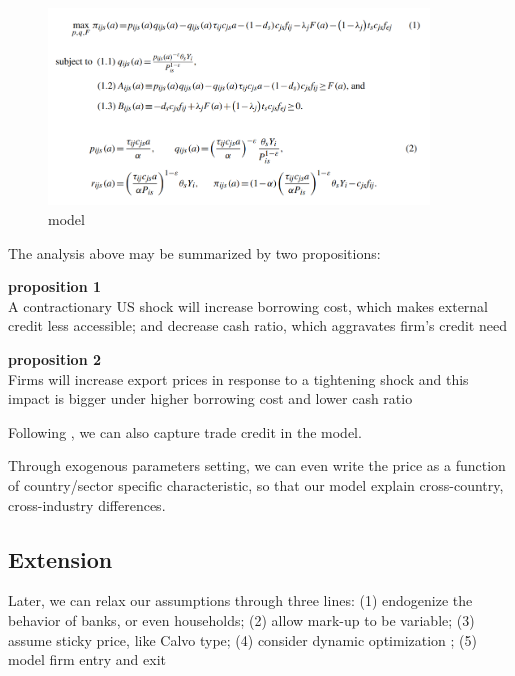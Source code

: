 \documentclass[12pt]{article}
\begin{document}
\begin{figure}
     \centering
         \includegraphics[width=0.9\textwidth]{latex/2023.10/Picture/Manova_model.png}
         \caption{\cite{manova2013credit} model}
         \label{fig: Manova_model}
\end{figure}

The analysis above may be summarized by two propositions:

\textbf{proposition 1} \\
A contractionary US shock will increase borrowing cost, which makes external credit less accessible; and decrease cash ratio, which aggravates firm's credit need

\textbf{proposition 2} \\
Firms will increase export prices in response to a tightening shock and this impact is bigger under higher borrowing cost and lower cash ratio


Following \cite{corugedo2011understanding}, we can also capture trade credit in the model.

Through exogenous parameters setting, we can even write the price as a function of country/sector specific characteristic, so that our model explain cross-country, cross-industry differences.


\subsection{Extension} 

Later, we can relax our assumptions through three lines: (1) endogenize the behavior of banks, or even households; (2) allow mark-up to be variable; (3) assume sticky price, like Calvo type; (4) consider dynamic optimization
; (5) model firm entry and exit
\end{document}
